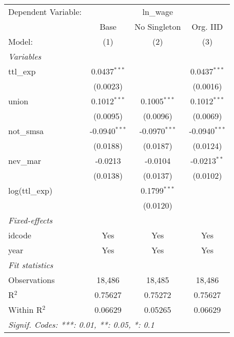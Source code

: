 \begingroup
\centering
\begin{tabular}{lccc}
   \tabularnewline \midrule \midrule
   Dependent Variable: & \multicolumn{3}{c}{ln\_wage}\\
                  & Base            & No Singleton    & Org. IID \\   
   Model:         & (1)             & (2)             & (3)\\  
   \midrule
   \emph{Variables}\\
   ttl\_exp       & 0.0437$^{***}$  &                 & 0.0437$^{***}$\\   
                  & (0.0023)        &                 & (0.0016)\\   
   union          & 0.1012$^{***}$  & 0.1005$^{***}$  & 0.1012$^{***}$\\   
                  & (0.0095)        & (0.0096)        & (0.0069)\\   
   not\_smsa      & -0.0940$^{***}$ & -0.0970$^{***}$ & -0.0940$^{***}$\\   
                  & (0.0188)        & (0.0187)        & (0.0124)\\   
   nev\_mar       & -0.0213         & -0.0104         & -0.0213$^{**}$\\   
                  & (0.0138)        & (0.0137)        & (0.0102)\\   
   log(ttl\_exp)  &                 & 0.1799$^{***}$  &   \\   
                  &                 & (0.0120)        &   \\   
   \midrule
   \emph{Fixed-effects}\\
   idcode         & Yes             & Yes             & Yes\\  
   year           & Yes             & Yes             & Yes\\  
   \midrule
   \emph{Fit statistics}\\
   Observations   & 18,486          & 18,485          & 18,486\\  
   R$^2$          & 0.75627         & 0.75272         & 0.75627\\  
   Within R$^2$   & 0.06629         & 0.05265         & 0.06629\\  
   \midrule \midrule
   \multicolumn{4}{l}{\emph{Signif. Codes: ***: 0.01, **: 0.05, *: 0.1}}\\
\end{tabular}
\par\endgroup



